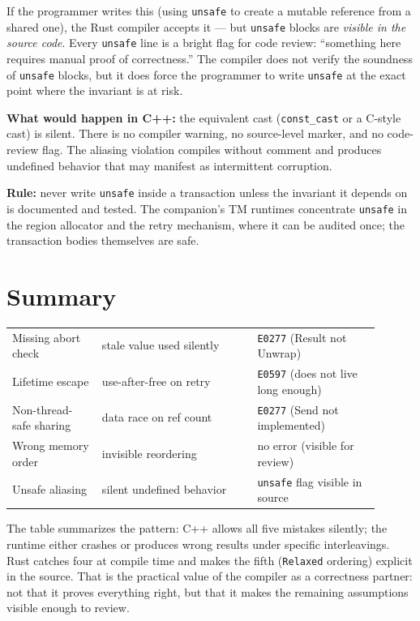 If the programmer writes this (using \texttt{unsafe} to create a mutable
reference from a shared one), the Rust compiler accepts it --- but
\texttt{unsafe} blocks are \emph{visible in the source code}. Every
\texttt{unsafe} line is a bright flag for code review: ``something here
requires manual proof of correctness.'' The compiler does not verify the
soundness of \texttt{unsafe} blocks, but it does force the programmer to
write \texttt{unsafe} at the exact point where the invariant is at risk.

\textbf{What would happen in C++:} the equivalent cast (\texttt{const\_cast}
or a C-style cast) is silent. There is no compiler warning, no source-level
marker, and no code-review flag. The aliasing violation compiles without
comment and produces undefined behavior that may manifest as intermittent
corruption.

\textbf{Rule:} never write \texttt{unsafe} inside a transaction unless the
invariant it depends on is documented and tested. The companion's TM runtimes
concentrate \texttt{unsafe} in the region allocator and the retry mechanism,
where it can be audited once; the transaction bodies themselves are safe.

\section*{Summary}

\begin{tabular}{M{0.22\linewidth}M{0.38\linewidth}M{0.30\linewidth}}
\hline
{} &  &  \\
\hline
Missing abort check & stale value used silently & \texttt{E0277} (Result not Unwrap) \\
Lifetime escape & use-after-free on retry & \texttt{E0597} (does not live long enough) \\
Non-thread-safe sharing & data race on ref count & \texttt{E0277} (Send not implemented) \\
Wrong memory order & invisible reordering & no error (visible for review) \\
Unsafe aliasing & silent undefined behavior & \texttt{unsafe} flag visible in source \\
\hline
\end{tabular}

The table summarizes the pattern: C++ allows all five mistakes silently; the
runtime either crashes or produces wrong results under specific
interleavings. Rust catches four at compile time and makes the fifth
(\texttt{Relaxed} ordering) explicit in the source. That is the practical
value of the compiler as a correctness partner: not that it proves
everything right, but that it makes the remaining assumptions visible enough
to review.
